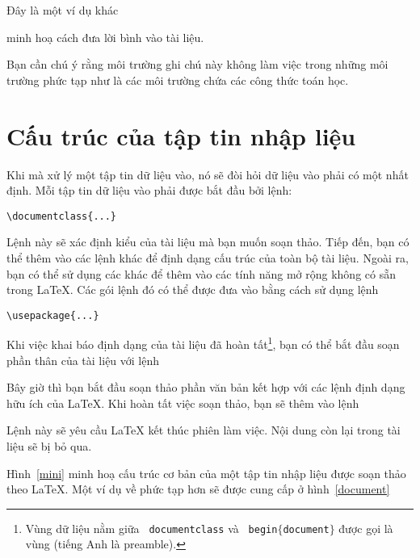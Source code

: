 \begin{example} Đây là một ví dụ khác
\begin{comment}
cũng đơn giản nhưng hữu dụng
\end{comment}
minh hoạ cách đưa lời bình
vào tài liệu.
\end{example}

Bạn cần chú ý rằng môi trường ghi chú này không làm việc trong những môi trường phức tạp như là các môi trường chứa các công thức toán học.

\section{Cấu trúc của tập tin nhập liệu}
Khi mà \LaTeXe{} xử lý một tập tin dữ liệu vào, nó sẽ đòi hỏi dữ
liệu vào phải có một  nhất định. Mỗi tập tin
dữ liệu vào phải được bắt đầu bởi lệnh:
\begin{code}
\verb|\documentclass{...}|
\end{code}

Lệnh này sẽ xác định kiểu của tài liệu mà bạn muốn soạn thảo. Tiếp
đến, bạn có thể thêm vào các lệnh khác để định dạng cấu trúc của
toàn bộ tài liệu. Ngoài ra, bạn có thể sử dụng các  khác
để thêm vào các tính năng mở rộng không có sẵn trong \LaTeX{}. Các
gói lệnh đó có thể được đưa vào bằng cách sử dụng lệnh
\begin{code}
\verb|\usepackage{...}|
\end{code}

Khi việc khai báo định dạng của tài liệu đã hoàn tất\footnote{Vùng dữ
liệu nằm giữa \texttt{\bs
    documentclass} và \texttt{\bs
    begin$\mathtt{\{}$document$\mathtt{\}}$} được gọi là vùng
  \emph{} (tiếng Anh là preamble).}, bạn có thể bắt đầu soạn phần thân của tài liệu với lệnh
\begin{code}
\verb||
\end{code}

Bây giờ thì bạn bắt đầu soạn thảo phần văn bản kết hợp với các
lệnh định dạng hữu ích của \LaTeX{}. Khi hoàn tất việc soạn thảo, bạn sẽ
thêm vào lệnh
\begin{code}
\verb||
\end{code}

Lệnh này sẽ yêu cầu \LaTeX{} kết thúc phiên làm việc. Nội dung còn lại trong tài liệu sẽ bị bỏ qua.

Hình~\ref{mini} minh hoạ cấu trúc cơ bản của một tập tin nhập liệu được soạn
thảo theo \LaTeX{}. Một ví dụ về  phức tạp
hơn sẽ được cung cấp ở hình~\ref{document}

